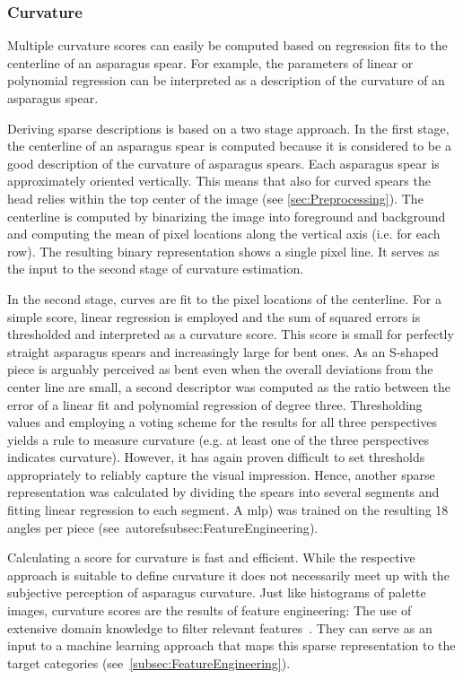 \subsubsection{Curvature}
\label{subsec:Curvature}

Multiple curvature scores can easily be computed based on regression fits to the centerline of an asparagus spear. For example, the parameters of linear or polynomial regression can be interpreted as a description of the curvature of an asparagus spear. 

Deriving sparse descriptions is based on a two stage approach. In the first stage, the centerline of an asparagus spear is computed because it is considered to be a good description of the curvature of asparagus spears. Each asparagus spear is approximately oriented vertically. This means that also for curved spears the head relies within the top center of the image (see \autoref{sec:Preprocessing}). The centerline is computed by binarizing the image into foreground and background and computing the mean of pixel locations along the vertical axis (i.e. for each row). The resulting binary representation shows a single pixel line. It serves as the input to the second stage of curvature estimation.

In the second stage, curves are fit to the pixel locations of the centerline. For a simple score, linear regression is employed and the sum of squared errors is thresholded and interpreted as a curvature score. This score is small for perfectly straight asparagus spears and increasingly large for bent ones. As an S-shaped piece is arguably perceived as bent even when the overall deviations from the center line are small, a second descriptor was computed as the ratio between the error of a linear fit and polynomial regression of degree three. Thresholding values and employing a voting scheme for the results for all three perspectives yields a rule to measure curvature (e.g. at least one of the three perspectives indicates curvature). However, it has again proven difficult to set thresholds appropriately to reliably capture the visual impression. Hence, another sparse representation was calculated by dividing the spears into several segments and fitting linear regression to each segment. A \acrfull{mlp}) was trained on the resulting 18 angles per piece (see~autoref{subsec:FeatureEngineering}).

\bigskip
Calculating a score for curvature is fast and efficient. While the respective approach is suitable to define curvature it does not necessarily meet up with the subjective perception of asparagus curvature. Just like histograms of palette images, curvature scores are the results of feature engineering: The use of extensive domain knowledge to filter relevant features~\citep{zheng2018feature}. They can serve as an input to a machine learning approach that maps this sparse representation to the target categories (see~\autoref{subsec:FeatureEngineering}).


